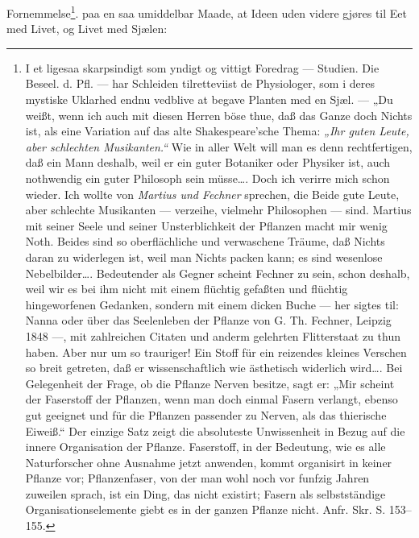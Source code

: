 \documentclass[12pt,a4paper]{book}
\begin{document}
\setcounter{footnote}{0}
Fornemmelse\footnote{I et ligesaa skarpsindigt som yndigt og vittigt Foredrag
--- Studien. Die Beseel. d. Pfl. --- har Schleiden tilretteviist de
Physiologer, som i deres mystiske Uklarhed endnu vedblive at begave Planten med
en Sjæl. --- „Du weißt, wenn ich auch mit diesen Herren böse thue, daß das
Ganze doch Nichts ist, als eine Variation auf das alte Shakespeare'sche Thema:
\emph{„Ihr guten Leute, aber schlechten Musikanten.“} Wie in aller Welt will
man es denn rechtfertigen, daß ein Mann deshalb, weil er ein guter Botaniker
oder Physiker ist, auch nothwendig ein guter Philosoph sein müsse\ldots. Doch
ich verirre mich schon wieder. Ich wollte von \emph{Martius und Fechner}
sprechen, die Beide gute Leute, aber schlechte Musikanten --- verzeihe,
vielmehr Philosophen --- sind. Martius mit seiner Seele und seiner
Unsterblichkeit der Pflanzen macht mir wenig Noth. Beides sind so
oberflächliche und verwaschene Träume, daß Nichts daran zu widerlegen ist, weil
man Nichts packen kann; es sind wesenlose Nebelbilder\ldots. Bedeutender als
Gegner scheint Fechner zu sein, schon deshalb, weil wir es bei ihm nicht mit
einem flüchtig gefaßten und flüchtig hingeworfenen Gedanken, sondern mit einem
dicken Buche --- her sigtes til: Nanna oder über das Seelenleben der Pflanze
von G. Th. Fechner, Leipzig 1848 ---, mit zahlreichen Citaten und anderm
gelehrten Flitterstaat zu thun haben. Aber nur um so trauriger! Ein Stoff für
ein reizendes kleines Verschen so breit getreten, daß er wissenschaftlich wie
ästhetisch widerlich wird\ldots. Bei Gelegenheit der Frage, ob die Pflanze
Nerven besitze, sagt er: „Mir scheint der Faserstoff der Pflanzen, wenn man
doch einmal Fasern verlangt, ebenso gut geeignet und für die Pflanzen passender
zu Nerven, als das thierische Eiweiß.“ Der einzige Satz zeigt die absoluteste
Unwissenheit in Bezug auf die innere Organisation der Pflanze. Faserstoff, in
der Bedeutung, wie es alle Naturforscher ohne Ausnahme jetzt anwenden, kommt
organisirt in keiner Pflanze vor; Pflanzenfaser, von der man wohl noch vor
funfzig Jahren zuweilen sprach, ist ein Ding, das nicht existirt; Fasern als
selbstständige Organisationselemente giebt es in der ganzen Pflanze nicht.
Anfr. Skr. S. 153--155.}.
paa en saa umiddelbar Maade, at Ideen uden videre gjøres til Eet med Livet, og
Livet med Sjælen:
\end{document}

